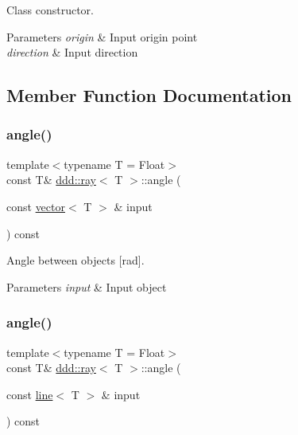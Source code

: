 Class constructor. 


\begin{DoxyParams}{Parameters}
{\em origin} & Input origin point \\
\hline
{\em direction} & Input direction \\
\hline
\end{DoxyParams}


\subsection{Member Function Documentation}
\mbox{\label{classddd_1_1ray_a01f164e76aedb3b4bb1e79cc9a989f0f}} 
\subsubsection{\texorpdfstring{angle()}{angle()}\hspace{0.1cm}{\footnotesize\ttfamily [1/5]}}
{\footnotesize\ttfamily template$<$typename T = Float$>$ \\
const T\& \hyperlink{classddd_1_1ray}{ddd\+::ray}$<$ T $>$\+::angle (\begin{DoxyParamCaption}\item[{const \hyperlink{classddd_1_1vector}{vector}$<$ T $>$ \&}]{input }\end{DoxyParamCaption}) const\hspace{0.3cm}{\ttfamily [inline]}}



Angle between objects \mbox{[}rad\mbox{]}. 


\begin{DoxyParams}{Parameters}
{\em input} & Input object \\
\hline
\end{DoxyParams}
\mbox{\label{classddd_1_1ray_a148b37b45554dbdffd57c5574ad3836f}} 
\subsubsection{\texorpdfstring{angle()}{angle()}\hspace{0.1cm}{\footnotesize\ttfamily [2/5]}}
{\footnotesize\ttfamily template$<$typename T = Float$>$ \\
const T\& \hyperlink{classddd_1_1ray}{ddd\+::ray}$<$ T $>$\+::angle (\begin{DoxyParamCaption}\item[{const \hyperlink{classddd_1_1line}{line}$<$ T $>$ \&}]{input }\end{DoxyParamCaption}) const\hspace{0.3cm}{\ttfamily [inline]}}



